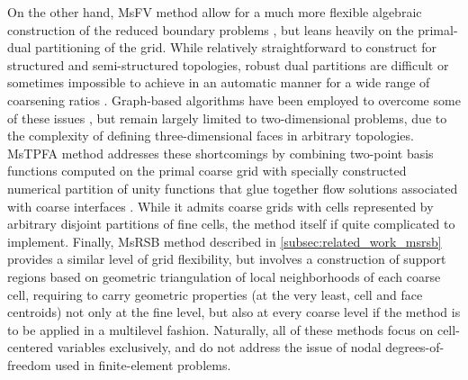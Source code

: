 On the other hand, MsFV method allow for a much more flexible algebraic construction of the reduced boundary problems \cite{Wang2014}, but leans heavily on the primal-dual partitioning of the grid.   While relatively straightforward to construct for structured and semi-structured topologies, robust dual partitions are difficult or sometimes impossible to achieve in an automatic manner for a wide range of coarsening ratios \cite{Moyner2014a}.   Graph-based algorithms have been employed to overcome some of these issues \cite{Mehrdoost2019}, but remain largely limited to two-dimensional problems, due to the complexity of defining three-dimensional faces in arbitrary topologies.   MsTPFA method addresses these shortcomings by combining two-point basis functions computed on the primal coarse grid with specially constructed numerical partition of unity functions that glue together flow solutions associated with coarse interfaces \cite{Moyner2014}.   While it admits coarse grids with cells represented by arbitrary disjoint partitions of fine cells, the method itself if quite complicated to implement.   Finally, MsRSB method described in \cref{subsec:related_work_msrsb} provides a similar level of grid flexibility, but involves a construction of support regions based on geometric triangulation of local neighborhoods of each coarse cell, requiring to carry geometric properties (at the very least, cell and face centroids) not only at the fine level, but also at every coarse level if the method is to be applied in a multilevel fashion.   Naturally, all of these methods focus on cell-centered variables exclusively, and do not address the issue of nodal degrees-of-freedom used in finite-element problems.

